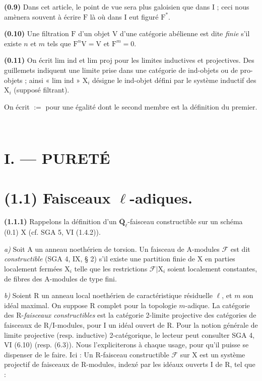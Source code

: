 \documentclass[11pt,leqno]{article}
\newcommand{\Page}[1]{\ifvmode\noindent\else\unskip\ \fi{\footnotesize\textcolor{gray}{[p.\,#1]}}\ \ignorespaces}
\begin{document}
\textbf{(0.9)} Dans cet article, le point de vue sera plus galoisien que dans I ; ceci nous amènera souvent à écrire \(\mathrm{F}\) là où dans I eut figuré \(\mathrm{F}^{*}\).

\textbf{(0.10)} Une filtration \(\mathrm{F}\) d’un objet \(\mathrm{V}\) d’une catégorie abélienne est dite \textit{finie} s’il existe \(n\) et \(m\) tels que \(\mathrm{F}^n\mathrm{V}=\mathrm{V}\) et \(\mathrm{F}^m=0\).

\textbf{(0.11)} On écrit lim ind et lim proj pour les limites inductives et projectives. Des guillemets indiquent une limite prise dans une catégorie de ind-objets ou de pro-objets ; ainsi « lim ind » \(\mathrm{X}_i\) désigne le ind-objet défini par le système inductif des \(\mathrm{X}_i\) (supposé filtrant).

On écrit \(:=\) pour une égalité dont le second membre est la définition du premier.

\Page{146}
\section*{\normalfont I. — PURETÉ}

\section*{\textbf{(1.1) Faisceaux \(\ell\)-adiques.}}

\textbf{(1.1.1)} Rappelons la définition d’un \(\overline{\mathbf{Q}}_\ell\)-faisceau constructible sur un schéma (0.1) \(\mathrm{X}\) (cf. SGA 5, VI (1.4.2)).

\textit{a)} Soit \(\mathrm{A}\) un anneau noethérien de torsion. Un faisceau de \(\mathrm{A}\)-modules \(\mathscr{F}\) est dit \textit{constructible} (SGA 4, IX, § 2) s’il existe une partition finie de \(\mathrm{X}\) en parties localement fermées \(\mathrm{X}_i\) telle que les restrictions \(\mathscr{F}|\mathrm{X}_i\) soient localement constantes, de fibres des \(\mathrm{A}\)-modules de type fini.

\textit{b)} Soient \(\mathrm{R}\) un anneau local noethérien de caractéristique résiduelle \(\ell\), et \(m\) son idéal maximal. On suppose \(\mathrm{R}\) complet pour la topologie \(m\)-adique. La catégorie des \(\mathrm{R}\)-\textit{faisceaux constructibles} est la catégorie 2-limite projective des catégories de faisceaux de \(\mathrm{R}/\mathrm{I}\)-modules, pour \(\mathrm{I}\) un idéal ouvert de \(\mathrm{R}\). Pour la notion générale de limite projective (resp. inductive) 2-catégorique, le lecteur peut consulter SGA 4, VI (6.10) (resp. (6.3)). Nous l’expliciterons à chaque usage, pour qu’il puisse se dispenser de le faire. Ici : Un \(\mathrm{R}\)-faisceau constructible \(\mathscr{F}\) sur \(\mathrm{X}\) est un système projectif de faisceaux de \(\mathrm{R}\)-modules, indexé par les idéaux ouverts \(\mathrm{I}\) de \(\mathrm{R}\), tel que :
\end{document}
